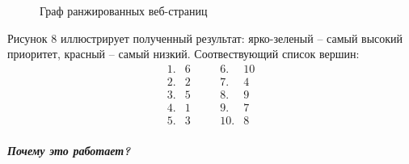 \documentclass[a5paper, 10pt]{article}
\theoremstyle{definition}
\theoremstyle{plain}
\theoremstyle{remark}
\begin{document}
\begin{figure}[h!]
\caption{Граф ранжированных веб-страниц}
\end{figure}
\newpage
 Рисунок 8 иллюстрирует полученный результат: ярко-зеленый -- самый высокий приоритет, красный -- самый низкий. Соотвествующий список вершин:
\begin{equation*}
\begin{matrix}
1. & 6 & \,\,\,\,\,\, & 6. & 10\\
2. & 2  & \,\,\,\,\,\, & 7. & 4\\
3. & 5  & \,\,\,\,\,\, & 8. & 9\\
4. & 1  & \,\,\,\,\,\, & 9. & 7\\
5. & 3  & \,\,\,\,\,\, &10. & 8
\end{matrix}
\end{equation*}
\\
\textbf{\textit{Почему это работает?}}
\end{document}
